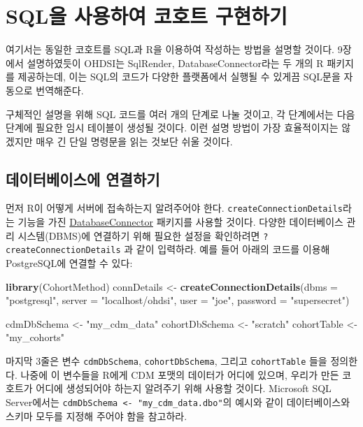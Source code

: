 \documentclass[11pt]{book}
\newenvironment{Shaded}{\begin{snugshade}}{\end{snugshade}}
\newcommand{\KeywordTok}[1]{\textcolor[rgb]{0.13,0.29,0.53}{\textbf{#1}}}
\newcommand{\DataTypeTok}[1]{\textcolor[rgb]{0.13,0.29,0.53}{#1}}
\newcommand{\StringTok}[1]{\textcolor[rgb]{0.31,0.60,0.02}{#1}}
\newcommand{\NormalTok}[1]{#1}
\theoremstyle{definition}
\theoremstyle{definition}
\theoremstyle{definition}
\theoremstyle{remark}
\begin{document}
\section{SQL을 사용하여 코호트 구현하기}\label{sql---}

여기서는 동일한 코호트를 SQL과 R을 이용하여 작성하는 방법을 설명할
것이다. 9장에서 설명하였듯이 OHDSI는 SqlRender, DatabaseConnector라는 두
개의 R 패키지를 제공하는데, 이는 SQL의 코드가 다양한 플랫폼에서 실행될
수 있게끔 SQL문을 자동으로 번역해준다.

구체적인 설명을 위해 SQL 코드를 여러 개의 단계로 나눌 것이고, 각
단계에서는 다음 단계에 필요한 임시 테이블이 생성될 것이다. 이런 설명
방법이 가장 효율적이지는 않겠지만 매우 긴 단일 명령문을 읽는 것보단 쉬울
것이다.

\subsection{데이터베이스에 연결하기}\label{-}

먼저 R이 어떻게 서버에 접속하는지 알려주어야 한다.
\texttt{createConnectionDetails}라는 기능을 가진
\href{https://ohdsi.github.io/DatabaseConnector/}{DatabaseConnector}
패키지를 사용할 것이다. 다양한 데이터베이스 관리 시스템(DBMS)에 연결하기
위해 필요한 설정을 확인하려면 \texttt{?createConnectionDetails} 과 같이
입력하라. 예를 들어 아래의 코드를 이용해 PostgreSQL에 연결할 수 있다:

\begin{Shaded}
\begin{Highlighting}[]
\KeywordTok{library}\NormalTok{(CohortMethod)}
\NormalTok{connDetails <-}\StringTok{ }\KeywordTok{createConnectionDetails}\NormalTok{(}\DataTypeTok{dbms =} \StringTok{"postgresql"}\NormalTok{,}
                                       \DataTypeTok{server =} \StringTok{"localhost/ohdsi"}\NormalTok{,}
                                       \DataTypeTok{user =} \StringTok{"joe"}\NormalTok{,}
                                       \DataTypeTok{password =} \StringTok{"supersecret"}\NormalTok{)}

\NormalTok{cdmDbSchema <-}\StringTok{ "my_cdm_data"}
\NormalTok{cohortDbSchema <-}\StringTok{ "scratch"}
\NormalTok{cohortTable <-}\StringTok{ "my_cohorts"}
\end{Highlighting}
\end{Shaded}

마지막 3줄은 변수 \texttt{cdmDbSchema}, \texttt{cohortDbSchema}, 그리고
\texttt{cohortTable} 들을 정의한다. 나중에 이 변수들을 R에게 CDM 포맷의
데이터가 어디에 있으며, 우리가 만든 코호트가 어디에 생성되어야 하는지
알려주기 위해 사용할 것이다. Microsoft SQL Server에서는
\texttt{cdmDbSchema\ \textless{}-\ "my\_cdm\_data.dbo"}의 예시와 같이
데이터베이스와 스키마 모두를 지정해 주어야 함을 참고하라.
\end{document}
